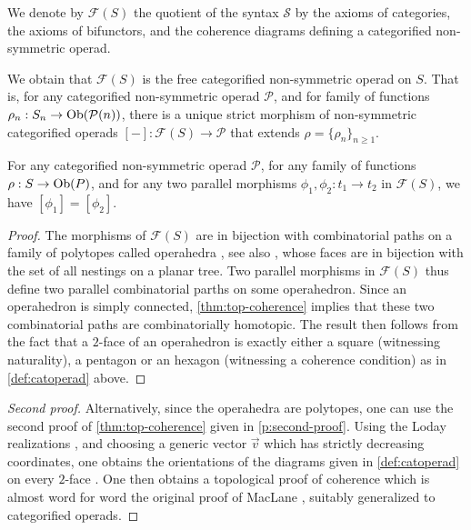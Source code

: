 \begin{definition}
    We denote by $\mathcal{F}(S)$ the quotient of the syntax $\mathcal{S}$ by the axioms of categories, the axioms of bifunctors, and the coherence diagrams defining a categorified non-symmetric operad. 
\end{definition}

We obtain that $\mathcal{F}(S)$ is the free categorified non-symmetric operad on $S$. 
That is, for any categorified non-symmetric operad $\mathcal{P}$, and for family of functions $\rho_n : S_n \to \mathrm{Ob}(\mathcal{P}(n))$, there is a unique strict morphism of non-symmetric categorified operads $[-]:\mathcal{F}(S) \to \mathcal{P}$ that extends $\rho=\{\rho_n\}_{n\geq 1}$. 

\begin{thm}
\label{thm:coherence-operahedra}
    For any categorified non-symmetric operad $\mathcal{P}$, for any family of functions $\rho : S \to \mathrm{Ob}(P)$, and for any two parallel morphisms $\phi_1,\phi_2: t_1 \to t_2$ in $\mathcal{F}(S)$, we have $[\phi_1]=[\phi_2]$.
\end{thm}

\begin{proof}
The morphisms of $\mathcal{F}(S)$ are in bijection with combinatorial paths on a family of polytopes called operahedra \cite[Section 2.1]{laplante-anfossiDiagonalOperahedra2022a}, see also \cite[Section 13]{DP15}, whose faces are in bijection with the set of all nestings on a planar tree. 
Two parallel morphisms in $\mathcal{F}(S)$ thus define two parallel combinatorial parths on some operahedron. 
Since an operahedron is simply connected, \cref{thm:top-coherence} implies that these two combinatorial paths are combinatorially homotopic. 
The result then follows from the fact that a $2$-face of an operahedron is exactly either a square (witnessing naturality), a pentagon or an hexagon (witnessing a coherence condition) as in \cref{def:catoperad} above.
\end{proof}

\begin{proof}[Second proof]
    Alternatively, since the operahedra are polytopes, one can use the second proof of \cref{thm:top-coherence} given in \cref{p:second-proof}. 
    Using the Loday realizations \cite[Section 2.2]{laplante-anfossiDiagonalOperahedra2022a}, and choosing a generic vector $\vec v$ which has strictly decreasing coordinates, one obtains the orientations of the diagrams given in \cref{def:catoperad} on every $2$-face \cite[Proposition 3.11]{laplante-anfossiDiagonalOperahedra2022a}.
    One then obtains a topological proof of coherence which is almost word for word the original proof of MacLane \cite[Theorem 3.1]{MacLane63}, suitably generalized to categorified operads. 
\end{proof}
   

